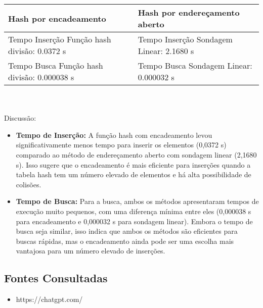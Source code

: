 \documentclass{article}
\begin{document}
\begin{tabularx}{\textwidth}{|>{\centering\arraybackslash}X|>{\centering\arraybackslash}X|} 
  \hline
   \textbf{Hash por encadeamento} & 
   \textbf{Hash por endereçamento aberto} \\ 
  \hline
  Tempo Inserção Função hash divisão: 0.0372 s  
  & Tempo Inserção Sondagem Linear: 2.1680 s  
  \\ \hline
  Tempo Busca Função hash divisão: 0.000038 s  
  & Tempo Busca Sondagem Linear: 0.000032 s  
  \\ \hline
\end{tabularx}
\\
\\Discussão:
\begin{itemize}
  \item \textbf{Tempo de Inserção:} A função hash com encadeamento levou significativamente menos tempo para inserir os elementos (0,0372 s) comparado ao método de endereçamento aberto com sondagem linear (2,1680 s).
  Isso sugere que o encadeamento é mais eficiente para inserções quando a tabela hash tem um número elevado de elementos e há alta possibilidade de colisões.

  \item \textbf{Tempo de Busca:} Para a busca, ambos os métodos apresentaram tempos de execução muito pequenos, com uma diferença mínima entre eles (0,000038 s para encadeamento e 0,000032 s para sondagem linear).
  Embora o tempo de busca seja similar, isso indica que ambos os métodos são eficientes para buscas rápidas, mas o encadeamento ainda pode ser uma escolha mais vantajosa para um número elevado de inserções.
  
\end{itemize}


\subsection*{Fontes Consultadas}
\begin{itemize}
    \item https://chatgpt.com/
\end{itemize}
\end{document}
